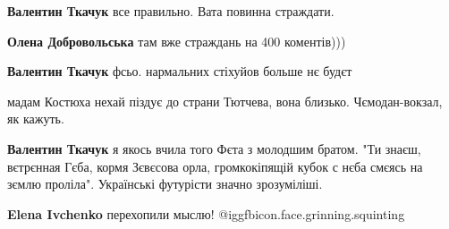 \begin{itemize}
 
\textbf{Валентин Ткачук} все правильно. Вата повинна страждати.

 
\textbf{Олена Добровольська} там вже страждань на 400 коментів)))

 
\textbf{Валентин Ткачук} фсьо. нармальних стіхуйов больше нє будєт

 
мадам Костюха нехай піздує до страни Тютчева, вона близько. Чємодан-вокзал, як кажуть.

 
\textbf{Валентин Ткачук} я якось вчила того Фєта з молодшим братом. "Ти знаєш, вєтрєнная Гєба, кормя Зєвєсова орла, громкокіпящій кубок с нєба смєясь на зємлю проліла". Українські футурісти значно зрозуміліші.

 
\textbf{Elena Ivchenko} перехопили мыслю! @igg{fbicon.face.grinning.squinting} 


\end{itemize}
